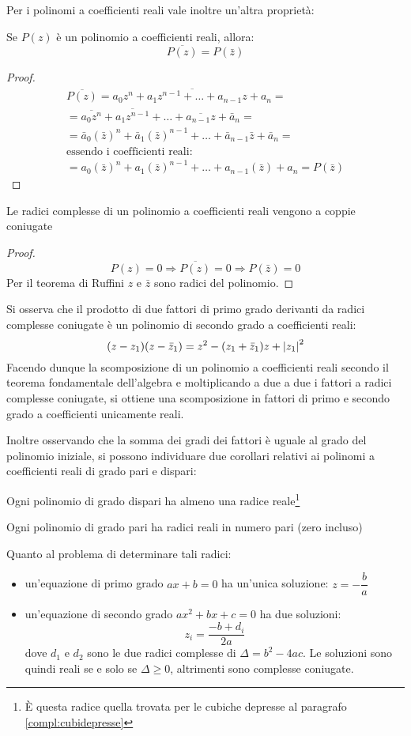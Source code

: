 Per i polinomi a coefficienti reali vale inoltre un'altra proprietà:
\begin{teor}
	Se $P(z)$ è un polinomio a coefficienti reali, allora:
	\[
		\overline{P(z)}=P(\bar z)
	\]
\end{teor}
\begin{proof}
	\begin{gather*}
		\overline{P(z)}=\overline{a_0z^n+a_1z^{n-1}+\dots+a_{n-1}z+a_n}=\\
		=\overline{a_0z^n}+\overline{a_1z^{n-1}}+\dots+\overline{a_{n-1}z}+\bar a_n=\\
		=\bar a_0(\bar z)^n+\bar a_1(\bar z)^{n-1}+\dots+\bar a_{n-1}\bar z+\bar a_n=\\
		\text{essendo i coefficienti reali:}\\
		=a_0(\bar z)^n+a_1(\bar z)^{n-1}+\dots+a_{n-1}(\bar z)+a_n=P(\bar z)
	\end{gather*}
\end{proof}
\begin{corol}
	Le radici complesse di un polinomio a coefficienti reali vengono a coppie coniugate
\end{corol}
\begin{proof}
	\[
		P(z) = 0 \Rightarrow \overline{P(z)} = 0 \Rightarrow P(\bar z) = 0
	\]
	Per il teorema di Ruffini $z$ e $\bar z$ sono radici del polinomio.
\end{proof}
Si osserva che il prodotto di due fattori di primo grado derivanti da radici complesse coniugate è un polinomio di secondo grado a coefficienti reali:
\[
	(z-z_1)(z- \bar z_1)=z^2-(z_1+\bar z_1)z+\left\lvert z_1 \right\rvert^2
\]
Facendo dunque la scomposizione di un polinomio a coefficienti reali secondo il teorema fondamentale dell'algebra e moltiplicando a due a due i fattori a radici complesse coniugate, si ottiene una scomposizione in fattori di primo e secondo grado a coefficienti unicamente reali.

Inoltre osservando che la somma dei gradi dei fattori è uguale al grado del polinomio iniziale, si possono individuare due corollari relativi ai polinomi a coefficienti reali di grado pari e dispari:
\begin{corol}
	Ogni polinomio di grado dispari ha almeno una radice reale\footnote{È questa radice quella trovata per le cubiche depresse al paragrafo \ref{compl:cubidepresse}}
\end{corol}
\begin{corol}
	Ogni polinomio di grado pari ha radici reali in numero pari (zero incluso)
\end{corol}
Quanto al problema di determinare tali radici:
\begin{itemize}
	\item un'equazione di primo grado $ax+b=0$ ha un'unica soluzione: $z=-\dfrac{b}{a}$
	\item un'equazione di secondo grado $ax^2+bx+c=0$ ha due soluzioni:
	      \[
		      z_i=\frac{-b+d_i}{2a}
	      \]
	      dove $d_1$ e $d_2$ sono le due radici complesse di $\Delta=b^2-4ac$. Le soluzioni sono quindi reali se e solo se $\Delta\geq0$, altrimenti sono complesse coniugate.
\end{itemize}

